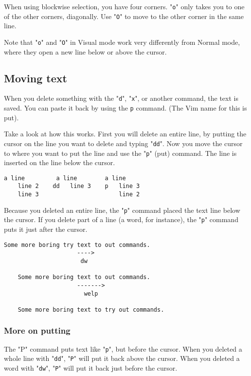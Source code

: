 When using blockwise selection, you have four corners.
"\verb!o!" only takes you to one of the other corners, diagonally.
Use "\verb!O!" to move to the other corner in the same line.

Note that "\verb!o!" and "\verb!O!" in Visual mode work very differently from Normal mode, where they open a new line below or above the cursor.

\subsection{Moving text}

When you delete something with the "\verb!d!", "\verb!x!", or another command, the text is saved.
You can paste it back by using the \verb:p: command.
(The Vim name for this is put).

Take a look at how this works.
First you will delete an entire line, by putting the cursor on the line you want to delete and typing "\verb!dd!".
Now you move the cursor to where you want to put the line and use the "\verb!p!" (put) command.
The line is inserted on the line below the cursor.

\begin{Verbatim}[samepage=true]
    a line         a line        a line
    line 2    dd   line 3    p   line 3
    line 3                       line 2
\end{Verbatim}

Because you deleted an entire line, the "\verb!p!" command placed the text line below the cursor.
If you delete part of a line (a word, for instance), the "\verb!p!" command puts it just after the cursor.

\begin{Verbatim}[samepage=true]
    Some more boring try text to out commands. 
                     ---->
                      dw

    Some more boring text to out commands. 
                     ------->
                       welp

    Some more boring text to try out commands. 
\end{Verbatim}

\subsubsection{More on putting}

The "P" command puts text like "\verb!p!", but before the cursor.
When you deleted a whole line with "\verb!dd!", "\verb!P!" will put it back above the cursor.
When you deleted a word with "\verb!dw!", "\verb!P!" will put it back just before the cursor.

